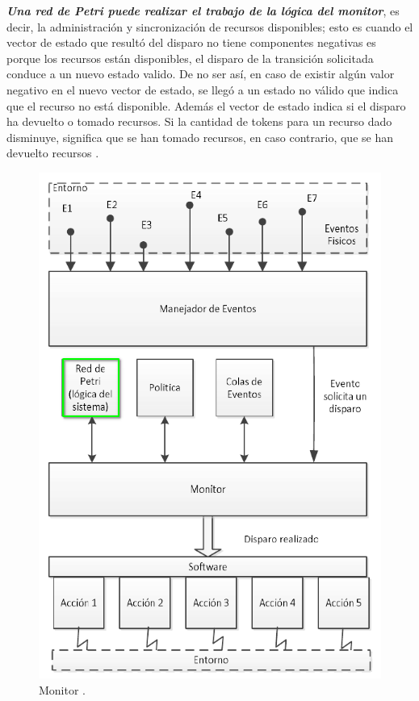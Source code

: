 \par \textbf{\textit{Una red de Petri puede realizar el trabajo de la lógica del monitor}}, es decir, la administración y sincronización de recursos disponibles; esto es cuando el vector de estado que resultó del disparo no tiene componentes negativas es porque los recursos están disponibles, el disparo de la transición solicitada conduce a un nuevo estado valido. De no ser así, en caso de existir algún valor negativo en el nuevo vector de estado, se llegó a un estado no válido que indica que el recurso no está disponible. Además el vector de estado indica si el disparo ha devuelto o tomado recursos. Si la cantidad de tokens para un recurso dado disminuye, significa que se han tomado recursos, en caso contrario, que se han devuelto recursos \cite{papermico, tesisnonino}.

\begin{figure}[H]
	\centering
	\includegraphics[scale=0.5]{Figures/marco teorico/monitormico.png}
	\caption[Monitor.]{Monitor \footnotemark.}
	\label{fig:monitormico}
\end{figure} 

